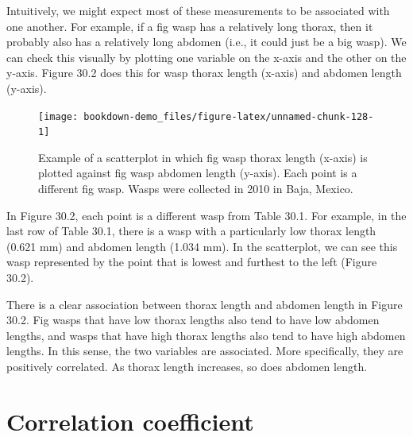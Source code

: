 \documentclass[
  openany]{krantz}
\begin{document}
Intuitively, we might expect most of these measurements to be associated with one another.
For example, if a fig wasp has a relatively long thorax, then it probably also has a relatively long abdomen (i.e., it could just be a big wasp).
We can check this visually by plotting one variable on the x-axis and the other on the y-axis.
Figure 30.2 does this for wasp thorax length (x-axis) and abdomen length (y-axis).

\begin{figure}
\texttt{[image: bookdown-demo\_files/figure-latex/unnamed-chunk-128-1]} \caption{Example of a scatterplot in which fig wasp thorax length (x-axis) is plotted against fig wasp abdomen length (y-axis). Each point is a different fig wasp. Wasps were collected in 2010 in Baja, Mexico.}\label{fig:unnamed-chunk-128}
\end{figure}

In Figure 30.2, each point is a different wasp from Table 30.1.
For example, in the last row of Table 30.1, there is a wasp with a particularly low thorax length (0.621 mm) and abdomen length (1.034 mm).
In the scatterplot, we can see this wasp represented by the point that is lowest and furthest to the left (Figure 30.2).

There is a clear association between thorax length and abdomen length in Figure 30.2.
Fig wasps that have low thorax lengths also tend to have low abdomen lengths, and wasps that have high thorax lengths also tend to have high abdomen lengths.
In this sense, the two variables are associated.
More specifically, they are positively correlated.
As thorax length increases, so does abdomen length.

\hypertarget{correlation-coefficient}{%
\section{Correlation coefficient}\label{correlation-coefficient}}
\end{document}
